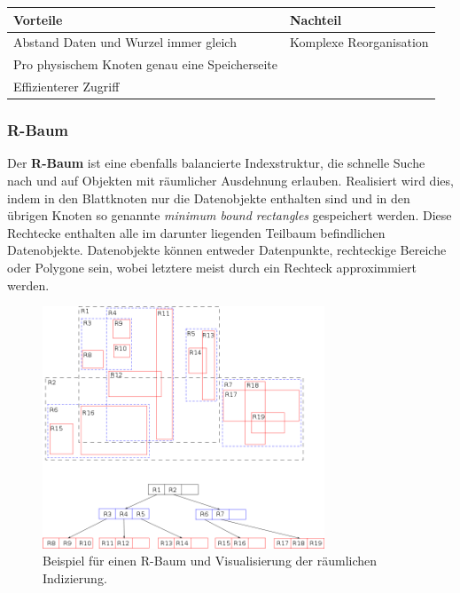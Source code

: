 \begin{table}[thbp]
\begin{tabular}{p{5cm} l}
	\toprule
	Vorteile & Nachteil \\
	\midrule
	Abstand Daten und Wurzel immer gleich & Komplexe Reorganisation \\
	\midrule
	Pro physischem Knoten genau eine Speicherseite & \\
	\midrule
	Effizienterer Zugriff & \\
	\bottomrule
\end{tabular}
\end{table}

\subsubsection{R-Baum}
Der \textbf{R-Baum} ist eine ebenfalls balancierte Indexstruktur, die schnelle Suche nach und
auf Objekten mit räumlicher Ausdehnung erlauben. Realisiert wird dies, indem
in den Blattknoten nur die Datenobjekte enthalten sind und in den übrigen Knoten
so genannte \textit{minimum bound rectangles} gespeichert werden. Diese Rechtecke
enthalten alle im darunter liegenden Teilbaum befindlichen Datenobjekte. Datenobjekte
können entweder Datenpunkte, rechteckige Bereiche oder Polygone sein, wobei letztere
meist durch ein Rechteck approximmiert werden.

\begin{figure}[ht]
	\centering
	\includegraphics[width=0.75\textwidth]{Figures/r_tree}
	\caption[R-Baum 2D]{Beispiel für einen R-Baum und Visualisierung der
	räumlichen Indizierung.\footnotemark}
	\label{fig:r_tree}
\end{figure}

